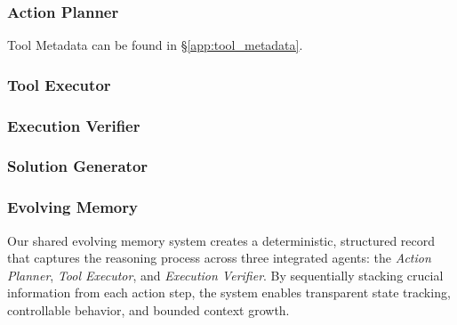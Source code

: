 \subsubsection{Action Planner}
\label{app:action_planner}
Tool Metadata can be found in \S\ref{app:tool_metadata}.



\clearpage
\subsubsection{Tool Executor}
\label{app:tool_executor}


\clearpage
\subsubsection{Execution Verifier}
\label{app:execution_verifier}


\clearpage
\subsubsection{Solution Generator}
\label{app:solution_generator}


\clearpage
\subsubsection{Evolving Memory}
\label{app:memory}


\vspace{-1mm}



Our shared evolving memory system creates a deterministic, structured record that captures the reasoning process across three integrated agents: the \textit{Action Planner}, \textit{Tool Executor}, and \textit{Execution Verifier}. By sequentially stacking crucial information from each action step, the system enables transparent state tracking, controllable behavior, and bounded context growth.

